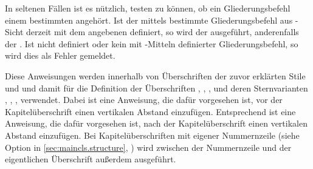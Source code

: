 \begin{Declaration}[0]
\end{Declaration}
In
seltenen Fällen ist es nützlich, testen zu können, ob ein Gliederungsbefehl
einem bestimmten  angehört. Ist der mittels  bestimmte
Gliederungsbefehl aus \KOMAScript-Sicht derzeit mit dem angebenen 
definiert, so wird der  ausgeführt, anderenfalls der
. Ist  nicht definiert oder kein mit
\KOMAScript-Mitteln definierter Gliederungsbefehl, so wird dies als Fehler
gemeldet.%
\EndIndexGroup


\begin{Declaration}
\end{Declaration}
Diese Anweisungen werden innerhalb von
Überschriften der zuvor erklärten Stile  und  und
damit für die Definition der Überschriften
,
,
,
 und deren Sternvarianten
,
,
,
 verwendet. Dabei ist
 eine Anweisung, die dafür vorgesehen ist, vor
der Kapitelüberschrift einen vertikalen Abstand einzufügen. Entsprechend ist
 eine Anweisung, die dafür vorgesehen ist, nach der
Kapitelüberschrift einen vertikalen Abstand
einzufügen. Bei
Kapitelüberschriften mit eigener Nummernzeile (siehe Option
 in \autoref{sec:maincls.structure},
) wird zwischen der Nummernzeile und
der eigentlichen Überschrift außerdem  ausgeführt.

